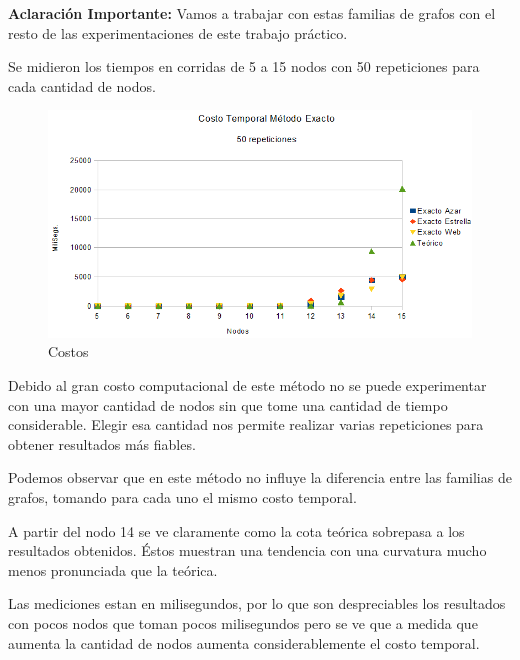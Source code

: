 \quad \textbf{Aclaración Importante:} Vamos a trabajar con estas familias de grafos con el resto de las experimentaciones de este trabajo práctico. 

\quad 

\quad Se midieron los tiempos en corridas de  5 a 15 nodos con 50 repeticiones para cada cantidad de nodos.

\begin{figure}[H]
	\centering
	\includegraphics[scale=0.8]{timingExacto.png}
\caption{Costos}
\end{figure}

\quad Debido al gran costo computacional de este método no se puede experimentar con una mayor cantidad de nodos sin que tome una cantidad de tiempo considerable. Elegir esa cantidad nos permite realizar varias repeticiones para obtener resultados más fiables.

\quad Podemos observar que en este método no influye la diferencia entre las familias de grafos, tomando para cada uno el mismo costo temporal. 

\quad A partir del nodo 14 se ve claramente como la cota teórica sobrepasa a los resultados obtenidos. Éstos muestran una tendencia con una curvatura mucho menos pronunciada que la teórica.

\quad Las mediciones estan en milisegundos, por lo que son despreciables los resultados con pocos nodos que toman pocos milisegundos pero se ve que a medida que aumenta la cantidad de nodos aumenta considerablemente el costo temporal.

